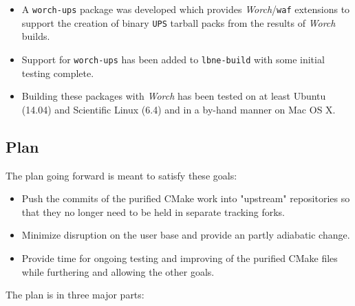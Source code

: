 \documentclass[usletter]{article}
\newcommand{\code}[1]{\texttt{#1}}
\newcommand{\waf}{\code{waf}\xspace}
\newcommand{\worch}{\textit{Worch}\xspace}
\newcommand{\ups}{\code{UPS}\xspace}
\begin{document}
\begin{itemize}
\item A \code{worch-ups} package\cite{worchups} was developed which
  provides \worch/\waf extensions to support the creation of binary
  \ups tarball packs from the results of \worch builds.

\item Support for \code{worch-ups} has been added to \code{lbne-build}
  with some initial testing complete.

\item Building these packages with \worch has been tested on at least
  Ubuntu (14.04) and Scientific Linux (6.4) and in a by-hand manner on
  Mac OS X.
\end{itemize}


\subsection{Plan}

The plan going forward is meant to satisfy these goals:
\begin{itemize}
	\item Push the commits of the purified CMake work into "upstream"
    repositories so that they no longer need to be held in separate
    tracking forks.
	\item Minimize disruption on the user base and provide an partly adiabatic
    change.
	\item Provide time for ongoing testing and improving of the purified CMake
    files while furthering and allowing the other goals.
\end{itemize}


\noindent The plan is in three major parts:
\end{document}
